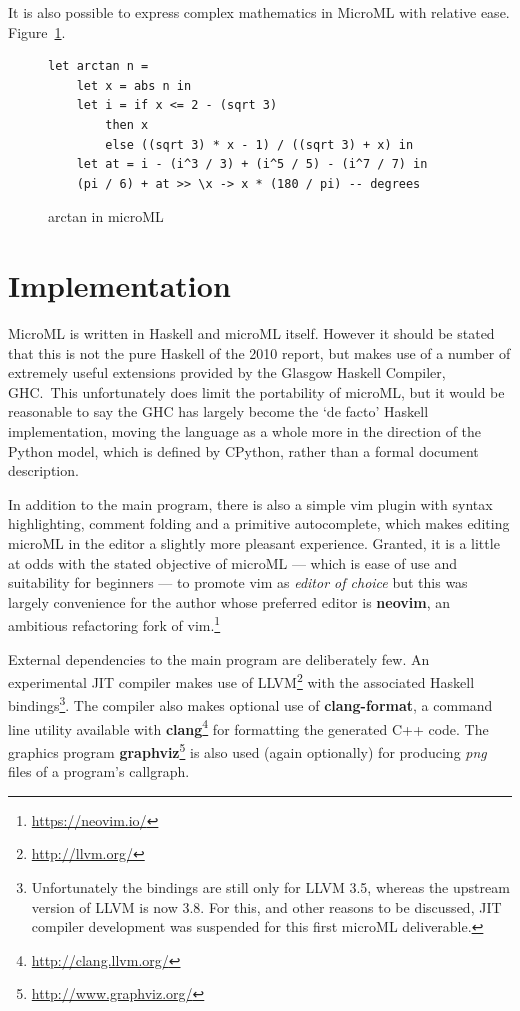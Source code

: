 \documentclass[12pt, a4paper]{report}
\begin{document}
It is also possible to express complex mathematics in MicroML with relative ease.
Figure~\ref{fig:arctan}.

\begin{figure}
    \begin{verbatim}
let arctan n = 
    let x = abs n in 
    let i = if x <= 2 - (sqrt 3)
        then x 
        else ((sqrt 3) * x - 1) / ((sqrt 3) + x) in 
    let at = i - (i^3 / 3) + (i^5 / 5) - (i^7 / 7) in 
    (pi / 6) + at >> \x -> x * (180 / pi) -- degrees
    \end{verbatim}
    \caption{arctan in microML}
\label{fig:arctan}
\end{figure}

\section{Implementation}
MicroML is written in Haskell and microML itself. However it should be stated that this is not the
pure Haskell of the 2010 report\cite{Marlow_haskell2010}, but makes use of a number of extremely
useful extensions provided by the Glasgow Haskell Compiler, GHC.\ This unfortunately does limit the
portability of microML, but it would be reasonable to say the GHC has largely become the `de facto'
Haskell implementation, moving the language as a whole more in the direction of the Python model,
which is defined by CPython, rather than a formal document description.

In addition to the main program, there is also a simple vim plugin with syntax highlighting,
comment folding and a primitive autocomplete, which makes editing microML in the editor a slightly
more pleasant experience. Granted, it is a little at odds with the stated objective of microML ---
which is ease of use and suitability for beginners --- to promote vim as \textit{editor of choice} but
this was largely convenience for the author whose preferred editor is \textbf{neovim}, an ambitious
refactoring fork of vim.\footnote{\url{https://neovim.io/}}

External dependencies to the main program are deliberately few. An experimental JIT
compiler makes use of LLVM\footnote{\url{http://llvm.org/}} with the associated Haskell
bindings\footnote{Unfortunately the bindings are still only for LLVM 3.5, whereas the
upstream version of LLVM is now 3.8. For this, and other reasons to be discussed, JIT
compiler development was suspended for this first microML deliverable.}. The compiler
also makes optional use of \textbf{clang-format}, a command line utility available with
\textbf{clang}\footnote{\url{http://clang.llvm.org/}} for formatting the generated C++ code. The
graphics program \textbf{graphviz}\footnote{\url{http://www.graphviz.org/}} is also used (again
optionally) for producing \textit{png} files of a program's callgraph.
\end{document}
